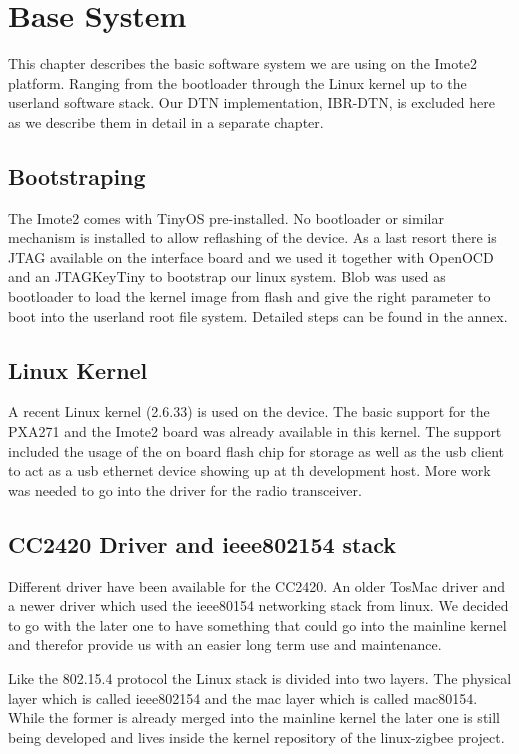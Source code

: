 \chapter{Base System}
This chapter describes the basic software system we are using on the Imote2
platform. Ranging from the bootloader through the Linux kernel up to the
userland software stack. Our DTN implementation, IBR-DTN, is excluded here as we
describe them in detail in a separate chapter.

\section{Bootstraping}
The Imote2 comes with TinyOS pre-installed. No bootloader or similar mechanism
is installed to allow reflashing of the device. As a last resort there is JTAG
available on the interface board and we used it together with OpenOCD and an
JTAGKeyTiny to bootstrap our linux system. Blob was used as bootloader to load
the kernel image from flash and give the right parameter to boot into the
userland root file system. Detailed steps can be found in the annex.

\section{Linux Kernel}
A recent Linux kernel (2.6.33) is used on the device. The basic support for the
PXA271 and the Imote2 board was already available in this kernel. The support
included the usage of the on board flash chip for storage as well as the usb
client to act as a usb ethernet device showing up at th development host. More
work was needed to go into the driver for the radio transceiver.

\section{CC2420 Driver and ieee802154 stack}
Different driver have been available for the CC2420. An older TosMac driver and
a newer driver which used the ieee80154 networking stack from linux. We decided
to go with the later one to have something that could go into the mainline
kernel and therefor provide us with an easier long term use and maintenance.

Like the 802.15.4 protocol the Linux stack is divided into two layers. The
physical layer which is called ieee802154 and the mac layer which is called
mac80154. While the former is already merged into the mainline kernel the later
one is still being developed and lives inside the kernel repository of the
linux-zigbee project.

